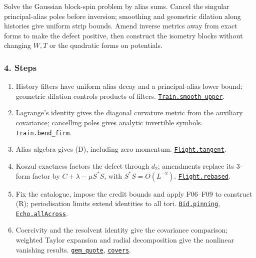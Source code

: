 \documentclass[
  letterpaper,
  11pt]{article}
\providecommand{\tightlist}{%
  \setlength{\itemsep}{0pt}\setlength{\parskip}{0pt}}
\begin{document}
Solve the Gaussian block-spin problem by alias sums. Cancel the singular
principal-alias poles before inversion; smoothing and geometric dilation
along histories give uniform strip bounds. Amend inverse metrics away
from exact forms to make the defect positive, then construct the
isometry blocks without changing \(W,T\) or the quadratic forms on
potentials.

\subsubsection{4. Steps}\label{steps-5}

\begin{enumerate}
\def\labelenumi{\arabic{enumi}.}
\tightlist
\item
  History filters have uniform alias decay and a principal-alias lower
  bound; geometric dilation controls products of filters.
  \href{https://github.com/yang-mills-group/OpenAI-YM-20261028/blob/3456e5e75cf8d4cd558955a5c7638fba2d68f464/YM/Next/FREE_KERNELS/Train.lean\#L169-L184}{\texttt{Train.smooth\_upper}}.
\item
  Lagrange's identity gives the diagonal curvature metric from the
  auxiliary covariance; cancelling poles gives analytic invertible
  symbols.
  \href{https://github.com/yang-mills-group/OpenAI-YM-20261028/blob/3456e5e75cf8d4cd558955a5c7638fba2d68f464/YM/Next/FREE_KERNELS/Bend.lean\#L188-L194}{\texttt{Train.bend\_firm}}.
\item
  Alias algebra gives (D), including zero momentum.
  \href{https://github.com/yang-mills-group/OpenAI-YM-20261028/blob/3456e5e75cf8d4cd558955a5c7638fba2d68f464/YM/Next/FREE_KERNELS/Primal.lean\#L63-L118}{\texttt{Flight.tangent}}.
\item
  Koszul exactness factors the defect through \(d_2\); amendments
  replace its 3-form factor by \(C+\lambda-\mu S^*S\), with
  \(S^*S=O(L^{-2})\).
  \href{https://github.com/yang-mills-group/OpenAI-YM-20261028/blob/3456e5e75cf8d4cd558955a5c7638fba2d68f464/YM/Next/FREE_KERNELS/Eject.lean\#L144-L181}{\texttt{Flight.rebased}}.
\item
  Fix the catalogue, impose the credit bounds and apply F06--F09 to
  construct (R); periodisation limits extend identities to all tori.
  \href{https://github.com/yang-mills-group/OpenAI-YM-20261028/blob/3456e5e75cf8d4cd558955a5c7638fba2d68f464/YM/Bid/Craft.lean\#L107-L166}{\texttt{Bid.pinning}},
  \href{https://github.com/yang-mills-group/OpenAI-YM-20261028/blob/3456e5e75cf8d4cd558955a5c7638fba2d68f464/YM/UVNext/PRICED_KERNELS/Echo.lean\#L105-L116}{\texttt{Echo.allAcross}}.
\item
  Coercivity and the resolvent identity give the covariance comparison;
  weighted Taylor expansion and radial decomposition give the nonlinear
  vanishing results.
  \href{https://github.com/yang-mills-group/OpenAI-YM-20261028/blob/3456e5e75cf8d4cd558955a5c7638fba2d68f464/YM/Further/FREE_COVARIANCE_KP/KP/Alloy.lean\#L110-L120}{\texttt{gem\_quote}},
  \href{https://github.com/yang-mills-group/OpenAI-YM-20261028/blob/3456e5e75cf8d4cd558955a5c7638fba2d68f464/YM/MultiNext/SIGNED_SOURCE_CONTINUATION/Routes.lean\#L63-L127}{\texttt{covers}}.
\end{enumerate}
\end{document}
